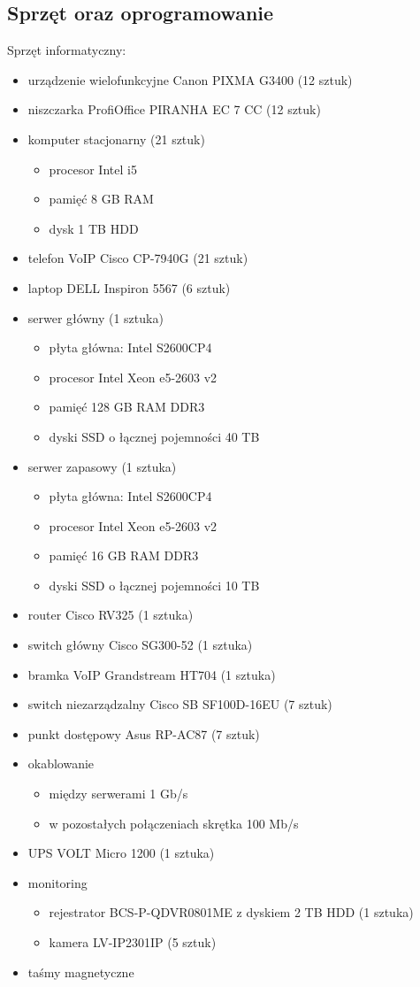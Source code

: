 \subsection{Sprzęt oraz oprogramowanie}
Sprzęt informatyczny:
\begin{itemize}
	\item urządzenie wielofunkcyjne Canon PIXMA G3400 (12 sztuk)
	\item niszczarka ProfiOffice PIRANHA EC 7 CC (12 sztuk)
	\item komputer stacjonarny (21 sztuk)
	\begin{itemize}
		\item procesor Intel i5
		\item pamięć 8 GB RAM 
		\item dysk 1 TB HDD 
	\end{itemize}
	\item telefon VoIP Cisco CP-7940G (21 sztuk)
	\item laptop DELL Inspiron 5567 (6 sztuk)
	\item serwer główny (1 sztuka)
	\begin{itemize}
		\item płyta główna: Intel S2600CP4
		\item procesor Intel Xeon e5-2603 v2
		\item pamięć 128 GB RAM DDR3
		\item dyski SSD o łącznej pojemności 40 TB 
	\end{itemize}
	\item serwer zapasowy (1 sztuka)
	\begin{itemize}
		\item płyta główna: Intel S2600CP4
		\item procesor Intel Xeon e5-2603 v2
		\item pamięć 16 GB RAM DDR3
		\item dyski SSD o łącznej pojemności 10 TB 
	\end{itemize}
	\item router Cisco RV325 (1 sztuka)
	\item switch główny Cisco SG300-52 (1 sztuka)
	\item bramka VoIP Grandstream HT704 (1 sztuka)
	\item switch niezarządzalny Cisco SB SF100D-16EU (7 sztuk)
	\item punkt dostępowy Asus RP-AC87 (7 sztuk)
	\item okablowanie 
	\begin{itemize}
		\item między serwerami 1 Gb/s
		\item w pozostałych połączeniach skrętka 100 Mb/s
	\end{itemize}
	\item UPS VOLT Micro 1200 (1 sztuka)
	\item monitoring
	\begin{itemize}
		\item rejestrator BCS-P-QDVR0801ME z dyskiem 2 TB HDD (1 sztuka)
		\item kamera LV-IP2301IP (5 sztuk)
	\end{itemize}
	\item taśmy magnetyczne
\end{itemize}
